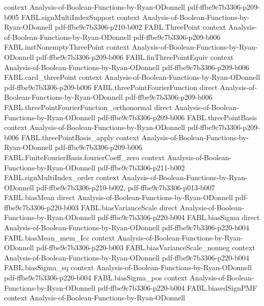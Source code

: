\begin{theorem}
  {context}
  {Analysis-of-Boolean-Functions-by-Ryan-ODonnell}
  {pdf-ffbe9c7b3306-p209-b005}
\proofstep
  {FABL.signMultiIndexSupport}
  {context}
  {Analysis-of-Boolean-Functions-by-Ryan-ODonnell}
  {pdf-ffbe9c7b3306-p210-b002}
\proofstep
  {FABL.ThreePoint}
  {context}
  {Analysis-of-Boolean-Functions-by-Ryan-ODonnell}
  {pdf-ffbe9c7b3306-p209-b006}
\proofstep
  {FABL.instNonemptyThreePoint}
  {context}
  {Analysis-of-Boolean-Functions-by-Ryan-ODonnell}
  {pdf-ffbe9c7b3306-p209-b006}
\proofstep
  {FABL.finThreePointEquiv}
  {context}
  {Analysis-of-Boolean-Functions-by-Ryan-ODonnell}
  {pdf-ffbe9c7b3306-p209-b006}
\proofstep
  {FABL.card_threePoint}
  {context}
  {Analysis-of-Boolean-Functions-by-Ryan-ODonnell}
  {pdf-ffbe9c7b3306-p209-b006}
\proofstep
  {FABL.threePointFourierFunction}
  {direct}
  {Analysis-of-Boolean-Functions-by-Ryan-ODonnell}
  {pdf-ffbe9c7b3306-p209-b006}
\proofstep
  {FABL.threePointFourierFunction_orthonormal}
  {direct}
  {Analysis-of-Boolean-Functions-by-Ryan-ODonnell}
  {pdf-ffbe9c7b3306-p209-b006}
\proofstep
  {FABL.threePointBasis}
  {context}
  {Analysis-of-Boolean-Functions-by-Ryan-ODonnell}
  {pdf-ffbe9c7b3306-p209-b006}
\proofstep
  {FABL.threePointBasis_apply}
  {context}
  {Analysis-of-Boolean-Functions-by-Ryan-ODonnell}
  {pdf-ffbe9c7b3306-p209-b006}
\proofstep
  {FABL.FiniteFourierBasis.fourierCoeff_zero}
  {context}
  {Analysis-of-Boolean-Functions-by-Ryan-ODonnell}
  {pdf-ffbe9c7b3306-p211-b002}
\proofstep
  {FABL.signMultiIndex_order}
  {context}
  {Analysis-of-Boolean-Functions-by-Ryan-ODonnell}
  {pdf-ffbe9c7b3306-p210-b002,
    pdf-ffbe9c7b3306-p013-b007}
\proofstep
  {FABL.biasMean}
  {direct}
  {Analysis-of-Boolean-Functions-by-Ryan-ODonnell}
  {pdf-ffbe9c7b3306-p220-b003}
\proofstep
  {FABL.biasVarianceScale}
  {direct}
  {Analysis-of-Boolean-Functions-by-Ryan-ODonnell}
  {pdf-ffbe9c7b3306-p220-b004}
\proofstep
  {FABL.biasSigma}
  {direct}
  {Analysis-of-Boolean-Functions-by-Ryan-ODonnell}
  {pdf-ffbe9c7b3306-p220-b004}
\proofstep
  {FABL.biasMean_mem_Icc}
  {context}
  {Analysis-of-Boolean-Functions-by-Ryan-ODonnell}
  {pdf-ffbe9c7b3306-p220-b003}
\proofstep
  {FABL.biasVarianceScale_nonneg}
  {context}
  {Analysis-of-Boolean-Functions-by-Ryan-ODonnell}
  {pdf-ffbe9c7b3306-p220-b004}
\proofstep
  {FABL.biasSigma_sq}
  {context}
  {Analysis-of-Boolean-Functions-by-Ryan-ODonnell}
  {pdf-ffbe9c7b3306-p220-b004}
\proofstep
  {FABL.biasSigma_pos}
  {context}
  {Analysis-of-Boolean-Functions-by-Ryan-ODonnell}
  {pdf-ffbe9c7b3306-p220-b004}
\proofstep
  {FABL.biasedSignPMF}
  {context}
  {Analysis-of-Boolean-Functions-by-Ryan-ODonnell}

\end{theorem}
